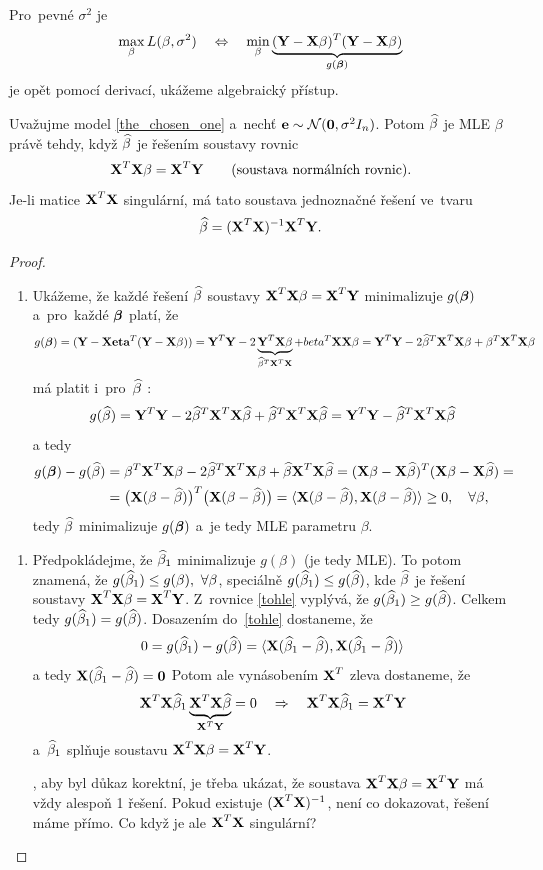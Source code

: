 Pro~pevné $\sigma^2$ je
 $$ \max_\beta L(\beta,\sigma^2)\quad\Leftrightarrow\quad\min_\beta\underbrace{(\textbf{Y}-\textbf{X}\beta)^T(\textbf{Y}-\textbf{X}\beta)}_{g(\boldsymbol{\beta})} $$
 je opět pomocí derivací, ukážeme algebraický přístup.

 \begin{theorem}
 	Uvažujme model \ref{the_chosen_one} a~nechť $\textbf{e}\sim\mathcal{N}(\textbf{0},\sigma^2 I_n)$. Potom $\widehat{\beta}$ je MLE $\beta$ právě tehdy, když $\widehat{\beta}$ je řešením soustavy rovnic
 	 $$ \textbf{X}^T\textbf{X}\beta = \textbf{X}^T\textbf{Y}\qquad\text{(soustava normálních rovnic)}. $$
 	Je-li matice $\textbf{X}^T\textbf{X}$ singulární, má tato soustava jednoznačné řešení ve~tvaru
 	 $$ \widehat{\beta} = (\textbf{X}^T\textbf{X})^{-1}\textbf{X}^T\textbf{Y}. $$
 	\begin{proof}
 		\begin{enumerate}[$\Leftarrow$]
 			\item Ukážeme, že každé řešení $\widehat{\beta}$ soustavy $\textbf{X}^T\textbf{X}\beta = \textbf{X}^T\textbf{Y}$ minimalizuje $g(\boldsymbol{\beta})$ a~pro~každé $\boldsymbol{\beta}$ platí, že
 			 $$ g(\boldsymbol{\beta}) = (\textbf{Y}-\textbf{X}\textbf{eta}^T(\textbf{Y}-\textbf{X}\beta)) = \textbf{Y}^T\textbf{Y}-2\underbrace{\textbf{Y}^T\textbf{X}\beta}_{\widehat{\beta}^T\textbf{X}^T\textbf{X}}+beta^T\textbf{X}\textbf{X}\beta = \textbf{Y}^T\textbf{Y}-2\widehat{\beta}^T\textbf{X}^T\textbf{X}\beta+\beta^T\textbf{X}^T\textbf{X}\beta $$
 			má platit i~pro~$\widehat{\beta}$ :
 			 $$ g(\widehat{\beta}) = \textbf{Y}^T\textbf{Y}-2\widehat{\beta}^T\textbf{X}^T\textbf{X}\widehat{\beta}+\widehat{\beta}^T\textbf{X}^T\textbf{X}\widehat{\beta} = \textbf{Y}^T\textbf{Y}-\widehat{\beta}^T\textbf{X}^T\textbf{X}\widehat{\beta} $$
 			a tedy
 			\begin{align}
 			g(\boldsymbol{\beta})-g(\widehat{\beta})& = \beta^T\textbf{X}^T\textbf{X}\beta-2\widehat{\beta}^T\textbf{X}^T\textbf{X}\beta+\widehat{\beta}\textbf{X}^T\textbf{X}\widehat{\beta} = (\textbf{X}\beta-\textbf{X}\widehat{\beta})^T(\textbf{X}\beta-\textbf{X}\widehat{\beta}) = \\&\label{tohle} = \big(\textbf{X}(\beta-\widehat{\beta}) \big)^T\big(\textbf{X}(\beta-\widehat{\beta}) \big) = \langle \textbf{X}(\beta-\widehat{\beta}),\textbf{X}(\beta-\widehat{\beta}) \rangle\geq 0,\quad\forall\beta,
 			\end{align}
 			 tedy $\widehat{\beta}$ minimalizuje $g(\boldsymbol{\beta})$ a~je tedy MLE parametru $\beta$.
 		\end{enumerate}
 	\begin{enumerate}[$\Rightarrow$]
 		\item Předpokládejme, že $\widehat{\beta}_1$ minimalizuje $g(\beta)$ (je tedy MLE). To potom znamená, že $g(\widehat{\beta}_1)\leq g(\beta),~\forall \beta$, speciálně $g(\widehat{\beta}_1)\leq g(\widehat{\beta})$, kde $\widehat{\beta}$ je řešení soustavy $\textbf{X}^T\textbf{X}\beta = \textbf{X}^T\textbf{Y}$. Z~rovnice \ref{tohle} vyplývá, že $g(\widehat{\beta}_1)\geq g(\widehat{\beta})$. Celkem tedy $g(\widehat{\beta}_1) = g(\widehat{\beta})$. Dosazením do~\ref{tohle} dostaneme, že
 		 $$ 0 = g(\widehat{\beta}_1)-g(\widehat{\beta}) = \langle \textbf{X}(\widehat{\beta}_1-\widehat{\beta}),\textbf{X}(\widehat{\beta}_1-\widehat{\beta}) \rangle $$
 		a tedy $\textbf{X}(\widehat{\beta}_1-\widehat{\beta}) = \textbf{0}$ Potom ale vynásobením $\textbf{X}^T$ zleva dostaneme, že
 		 $$ \textbf{X}^T\textbf{X}\widehat{\beta}_1\underbrace{\textbf{X}^T\textbf{X}\widehat{\beta}}_{\textbf{X}^T\textbf{Y}} = 0\quad\Rightarrow\quad \textbf{X}^T\textbf{X}\widehat{\beta}_1 = \textbf{X}^T\textbf{Y} $$
 		 a~$\widehat{\beta}_1$ splňuje soustavu $\textbf{X}^T\textbf{X}\beta = \textbf{X}^T\textbf{Y}$.
 		
 		, aby byl důkaz korektní, je třeba ukázat, že soustava $\textbf{X}^T\textbf{X}\beta = \textbf{X}^T\textbf{Y}$ má vždy alespoň 1 řešení. Pokud existuje $(\textbf{X}^T\textbf{X})^{-1}$, není co dokazovat, řešení máme přímo. Co když je ale $\textbf{X}^T\textbf{X}$ singulární?
 	\end{enumerate}
 	\end{proof}
 \end{theorem}
